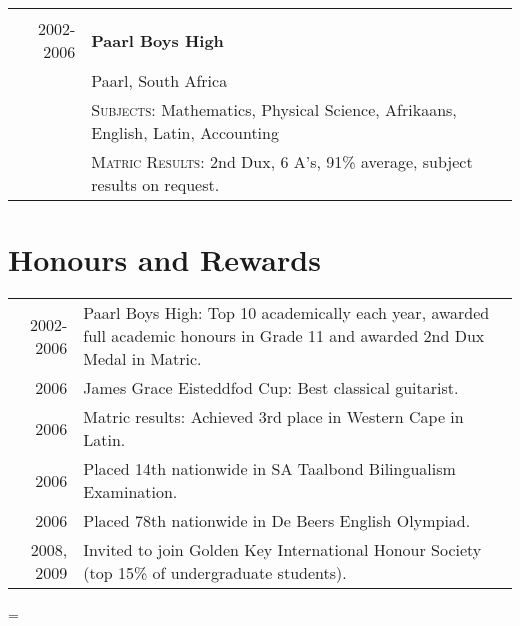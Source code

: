\documentclass[a4paper,10pt,notitlepage]{article}
\newenvironment{absolutelynopagebreak}
  {\par\nobreak\vfil\penalty0\vfilneg
   \vtop\bgroup}
  {\par\xdef\tpd{\the\prevdepth}\egroup
   \prevdepth=\tpd}
\begin{document}
\begin{absolutelynopagebreak}
\begin{tabular}{r|p{11cm}}
		\multicolumn{2}{c}{}\\
		
		\textsc{2002-2006} & \textbf{Paarl Boys High} \\ & \normalsize Paarl, South Africa \\
		&\textsc{Subjects}: Mathematics, Physical Science, Afrikaans, English, Latin, Accounting \\
		&\normalsize \textsc{Matric Results}: 2nd Dux, 6 A's, 91\% average, subject results on request. \\
		
	\end{tabular}
	
	\section{Honours and Rewards}
	\begin{tabular}{r|p{11cm}}
		\textsc{2002-2006}  & Paarl Boys High: Top 10 academically each year, awarded full academic honours in Grade 11 and awarded 2nd Dux Medal in Matric. \\
		\textsc{2006}       & James Grace Eisteddfod Cup: Best classical guitarist.                                                                          \\
		\textsc{2006}       & Matric results: Achieved 3rd place in Western Cape in Latin.                                                                   \\
		\textsc{2006}       & Placed 14th nationwide in SA Taalbond Bilingualism Examination.                                                                \\
		\textsc{2006}       & Placed 78th nationwide in De Beers English Olympiad.                                                                           \\
		\textsc{2008, 2009} & Invited to join Golden Key International Honour Society (top 15\% of undergraduate students).                                  
	\end{tabular}
	
\end{absolutelynopagebreak}


\addtolength{\voffset}{-0.2cm} %
\end{document}
